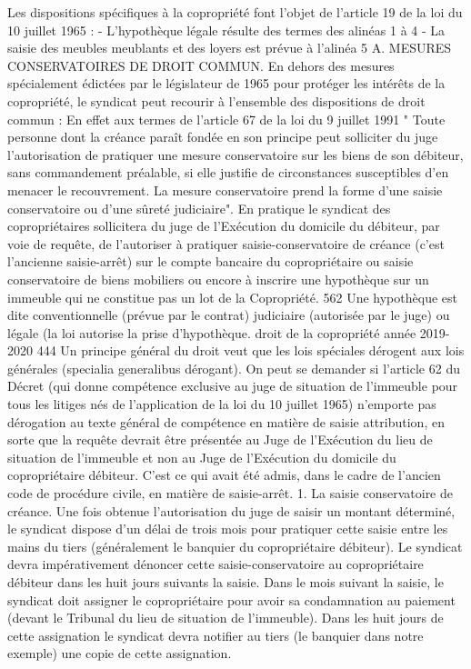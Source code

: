 Les dispositions spécifiques à la copropriété font l’objet de l’article 19 de la loi du 10 juillet 1965 :
- L’hypothèque légale résulte des termes des alinéas 1 à 4
- La saisie des meubles meublants et des loyers est prévue à l’alinéa 5
A. MESURES CONSERVATOIRES DE DROIT COMMUN.
En dehors des mesures spécialement édictées par le législateur de 1965 pour protéger les intérêts de la copropriété, le syndicat peut recourir à l'ensemble des dispositions de droit commun :
En effet aux termes de l'article 67 de la loi du 9 juillet 1991
" Toute personne dont la créance paraît fondée en son principe peut solliciter du juge l'autorisation de pratiquer une mesure conservatoire sur les biens de son débiteur, sans commandement préalable, si elle justifie de circonstances susceptibles d'en menacer le recouvrement. La mesure conservatoire prend la forme d'une saisie conservatoire ou d'une sûreté judiciaire".
En pratique le syndicat des copropriétaires sollicitera du juge de l'Exécution du domicile du débiteur, par voie de requête, de l'autoriser à pratiquer saisie-conservatoire de créance (c'est l'ancienne saisie-arrêt) sur le compte bancaire du copropriétaire ou saisie conservatoire de biens mobiliers ou encore à inscrire une hypothèque sur un immeuble qui ne constitue pas un lot de la Copropriété.
562 Une hypothèque est dite conventionnelle (prévue par le contrat) judiciaire (autorisée par le juge) ou légale (la loi autorise la prise d’hypothèque.
droit de la copropriété année 2019-2020
444
Un principe général du droit veut que les lois spéciales dérogent aux lois générales (specialia generalibus dérogant). On peut se demander si l'article 62 du Décret (qui donne compétence exclusive au juge de situation de l'immeuble pour tous les litiges nés de l'application de la loi du 10 juillet 1965) n’emporte pas dérogation au texte général de compétence en matière de saisie attribution, en sorte que la requête devrait être présentée au Juge de l'Exécution du lieu de situation de l'immeuble et non au Juge de l'Exécution du domicile du copropriétaire débiteur. C'est ce qui avait été admis, dans le cadre de l'ancien code de procédure civile, en matière de saisie-arrêt.
1. La saisie conservatoire de créance.
Une fois obtenue l'autorisation du juge de saisir un montant déterminé, le syndicat dispose d'un délai de trois mois pour pratiquer cette saisie entre les mains du tiers (généralement le banquier du copropriétaire débiteur).
Le syndicat devra impérativement dénoncer cette saisie-conservatoire au copropriétaire débiteur dans les huit jours suivants la saisie.
Dans le mois suivant la saisie, le syndicat doit assigner le copropriétaire pour avoir sa condamnation au paiement (devant le Tribunal du lieu de situation de l'immeuble). Dans les huit jours de cette assignation le syndicat devra notifier au tiers (le banquier dans notre exemple) une copie de cette assignation.
